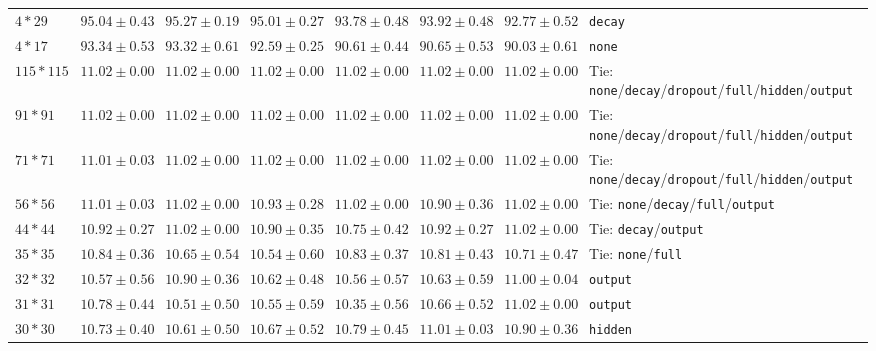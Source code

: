 \documentclass[conference]{IEEEtran}
\begin{document}
\begin{longtable}{@{}lccccccl@{}}
$4*29$ & $95.04 \pm 0.43$ & \bfseries $95.27 \pm 0.19$ & $95.01 \pm 0.27$ & $93.78 \pm 0.48$ & $93.92 \pm 0.48$ & $92.77 \pm 0.52$ & \texttt{decay} \\
$4*17$ & \bfseries $93.34 \pm 0.53$ & $93.32 \pm 0.61$ & $92.59 \pm 0.25$ & $90.61 \pm 0.44$ & $90.65 \pm 0.53$ & $90.03 \pm 0.61$ & \texttt{none} \\
$115*115$ & \bfseries $11.02 \pm 0.00$ & \bfseries $11.02 \pm 0.00$ & \bfseries $11.02 \pm 0.00$ & \bfseries $11.02 \pm 0.00$ & \bfseries $11.02 \pm 0.00$ & \bfseries $11.02 \pm 0.00$ & Tie: \texttt{none}/\texttt{decay}/\texttt{dropout}/\texttt{full}/\texttt{hidden}/\texttt{output} \\
$91*91$ & \bfseries $11.02 \pm 0.00$ & \bfseries $11.02 \pm 0.00$ & \bfseries $11.02 \pm 0.00$ & \bfseries $11.02 \pm 0.00$ & \bfseries $11.02 \pm 0.00$ & \bfseries $11.02 \pm 0.00$ & Tie: \texttt{none}/\texttt{decay}/\texttt{dropout}/\texttt{full}/\texttt{hidden}/\texttt{output} \\
$71*71$ & \bfseries $11.01 \pm 0.03$ & \bfseries $11.02 \pm 0.00$ & \bfseries $11.02 \pm 0.00$ & \bfseries $11.02 \pm 0.00$ & \bfseries $11.02 \pm 0.00$ & \bfseries $11.02 \pm 0.00$ & Tie: \texttt{none}/\texttt{decay}/\texttt{dropout}/\texttt{full}/\texttt{hidden}/\texttt{output} \\
$56*56$ & \bfseries $11.01 \pm 0.03$ & \bfseries $11.02 \pm 0.00$ & $10.93 \pm 0.28$ & \bfseries $11.02 \pm 0.00$ & $10.90 \pm 0.36$ & \bfseries $11.02 \pm 0.00$ & Tie: \texttt{none}/\texttt{decay}/\texttt{full}/\texttt{output} \\
$44*44$ & $10.92 \pm 0.27$ & \bfseries $11.02 \pm 0.00$ & $10.90 \pm 0.35$ & $10.75 \pm 0.42$ & $10.92 \pm 0.27$ & \bfseries $11.02 \pm 0.00$ & Tie: \texttt{decay}/\texttt{output} \\
$35*35$ & \bfseries $10.84 \pm 0.36$ & $10.65 \pm 0.54$ & $10.54 \pm 0.60$ & \bfseries $10.83 \pm 0.37$ & $10.81 \pm 0.43$ & $10.71 \pm 0.47$ & Tie: \texttt{none}/\texttt{full} \\
$32*32$ & $10.57 \pm 0.56$ & $10.90 \pm 0.36$ & $10.62 \pm 0.48$ & $10.56 \pm 0.57$ & $10.63 \pm 0.59$ & \bfseries $11.00 \pm 0.04$ & \texttt{output} \\
$31*31$ & $10.78 \pm 0.44$ & $10.51 \pm 0.50$ & $10.55 \pm 0.59$ & $10.35 \pm 0.56$ & $10.66 \pm 0.52$ & \bfseries $11.02 \pm 0.00$ & \texttt{output} \\
$30*30$ & $10.73 \pm 0.40$ & $10.61 \pm 0.50$ & $10.67 \pm 0.52$ & $10.79 \pm 0.45$ & \bfseries $11.01 \pm 0.03$ & $10.90 \pm 0.36$ & \texttt{hidden} \\

\end{longtable}
\end{document}
